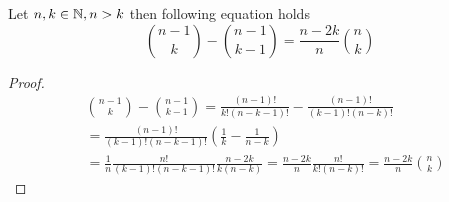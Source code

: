 \begin{comment}
\begin{thm}[XXXMean number of visits to $b$ before returning to origin in symmetric random walk]\label{thm-mean_number_visits}
 \Lrws. Mean number $\mu_b$ of visits of the walk to point $b$ before returning to origin is equal to 1.
\end{thm}
\begin{proof}
 aa
\end{proof}
\end{comment}

\begin{lemma}\label{lemma-binom_identity}
 Let $n,k \in \mathbb{N}, n>k$ then following equation holds
 \[
 \binom{n-1}{k}-\binom{n-1}{k-1}=\frac{n-2k}{n}\binom{n}{k}
 \]
\end{lemma}
\begin{proof}
  \[
  \begin{split}
    & \binom{n-1}{k}-\binom{n-1}{k-1}
     =\frac{ \left( n-1 \right) !}{k! \left( n-k-1 \right) !}-\frac{ \left( n-1 \right) !}{ \left( k-1 \right) ! \left( n-k \right) !}\\
    & =\frac{ \left( n-1 \right) !}{ \left( k-1 \right) ! \left( n-k-1 \right) !} \left( \frac{1}{k}-\frac{1}{n-k} \right)\\
    & =\frac{1}{n}\frac{n!}{ \left( k-1 \right) ! \left( n-k-1 \right) !}\frac{n-2k}{k \left( n-k \right) }
    =\frac{n-2k}{n}\frac{n!}{k! \left( n-k \right) !}=\frac{n-2k}{n}\binom{n}{k}
     \end{split}
  \]
\end{proof}

